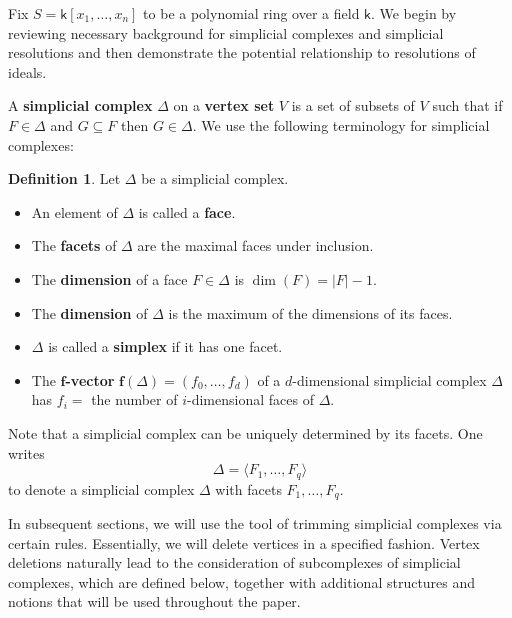 \documentclass[11pt]{article}
\theoremstyle{definition}
\newtheorem{defi}[theo]{Definition}
\numberwithin{equation}{section}
\newcommand{\f}{\mathbf{f}}
\newcommand{\D}{\Delta}
\newcommand{\tuple}[1]{\langle #1 \rangle}
\newcommand{\sfk}{\mathsf k}
\begin{document}
Fix $S=\sfk[x_1,\ldots,x_n]$ to be a polynomial ring over a
        field $\sfk$.  We begin by reviewing necessary background for
        simplicial complexes and simplicial resolutions and then
        demonstrate the potential relationship to resolutions of
        ideals.


A {\bf simplicial complex} $\D$ on a {\bf vertex set } $V$ is a set
of subsets of $V$ such that if $F \in \D$ and $G \subseteq F$ then $G
\in \D$.  We use the following terminology for simplicial complexes:

\begin{defi}  Let $\D$ be a simplicial complex.
\begin{itemize}
\item An element of $\D$ is called a {\bf face}.
\item The {\bf facets} of $\D$ are the maximal faces under inclusion.
\item  The {\bf dimension} of a face $F \in \D$ is $\dim(F)=|F|-1$.
\item The {\bf dimension} of $\D$ is the maximum of the dimensions of its faces.
\item $\D$ is called a {\bf simplex} if it has one facet.
\item The {\bf $\f$-vector} $\f(\D)=(f_0,\ldots,f_d)$ of a
$d$-dimensional simplicial complex $\D$ has  $f_i=$
the number of $i$-dimensional faces of $\D$. 
\end{itemize}
\end{defi}

Note that a simplicial complex can be uniquely determined by its facets.  One writes
$$\D = \tuple{F_1, \ldots, F_q}$$
to denote a simplicial complex $\D$ with facets $F_1,\ldots,F_q$.


In subsequent sections, we will use the tool of trimming
        simplicial complexes via certain rules.  Essentially, we will
        delete vertices in a specified fashion.  Vertex deletions
        naturally lead to the consideration of subcomplexes of
        simplicial complexes, which are defined below, together with
        additional structures and notions that will be used throughout
        the paper.
\end{document}
